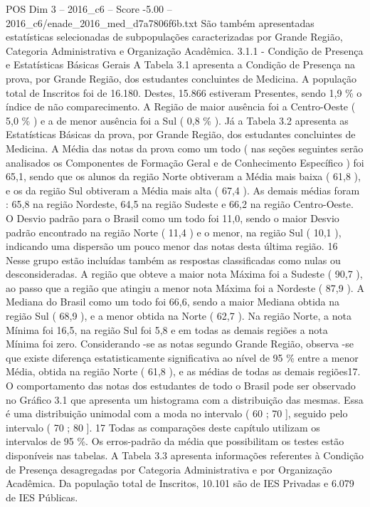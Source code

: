 \begin{textsample}{POS Dim 3 – 2016\_c6 – Score -5.00 – 2016\_c6/enade\_2016\_med\_d7a7806f6b.txt}
São também apresentadas estatísticas selecionadas de subpopulações caracterizadas por Grande Região, Categoria Administrativa e Organização Acadêmica. 3.1.1 - Condição de Presença e Estatísticas Básicas Gerais A Tabela 3.1 apresenta a Condição de Presença na prova, por Grande Região, dos estudantes concluintes de Medicina.
A população total de Inscritos foi de 16.180.
Destes, 15.866 estiveram Presentes, sendo 1,9 \% o índice de não comparecimento.
A Região de maior ausência foi a Centro-Oeste ( 5,0 \% ) e a de menor ausência foi a Sul ( 0,8 \% ).
Já a Tabela 3.2 apresenta as Estatísticas Básicas da prova, por Grande Região, dos estudantes concluintes de Medicina.
A Média das notas da prova como um todo ( nas seções seguintes serão analisados os Componentes de Formação Geral e de Conhecimento Específico ) foi 65,1, sendo que os alunos da região Norte obtiveram a Média mais baixa ( 61,8 ), e os da região Sul obtiveram a Média mais alta ( 67,4 ).
As demais médias foram : 65,8 na região Nordeste, 64,5 na região Sudeste e 66,2 na região Centro-Oeste.
O Desvio padrão para o Brasil como um todo foi 11,0, sendo o maior Desvio padrão encontrado na região Norte ( 11,4 ) e o menor, na região Sul ( 10,1 ), indicando uma dispersão um pouco menor das notas desta última região. 16 Nesse grupo estão incluídas também as respostas classificadas como nulas ou desconsideradas.
A região que obteve a maior nota Máxima foi a Sudeste ( 90,7 ), ao passo que a região que atingiu a menor nota Máxima foi a Nordeste ( 87,9 ).
A Mediana do Brasil como um todo foi 66,6, sendo a maior Mediana obtida na região Sul ( 68,9 ), e a menor obtida na Norte ( 62,7 ).
Na região Norte, a nota Mínima foi 16,5, na região Sul foi 5,8 e em todas as demais regiões a nota Mínima foi zero.
Considerando -se as notas segundo Grande Região, observa -se que existe diferença estatisticamente significativa ao nível de 95 \% entre a menor Média, obtida na região Norte ( 61,8 ), e as médias de todas as demais regiões17.
O comportamento das notas dos estudantes de todo o Brasil pode ser observado no Gráfico 3.1 que apresenta um histograma com a distribuição das mesmas.
Essa é uma distribuição unimodal com a moda no intervalo ( 60 ; 70 ], seguido pelo intervalo ( 70 ; 80 ]. 17 Todas as comparações deste capítulo utilizam os intervalos de 95 \%.
Os erros-padrão da média que possibilitam os testes estão disponíveis nas tabelas.
A Tabela 3.3 apresenta informações referentes à Condição de Presença desagregadas por Categoria Administrativa e por Organização Acadêmica.
Da população total de Inscritos, 10.101 são de IES Privadas e 6.079 de IES Públicas.

\end{textsample}
